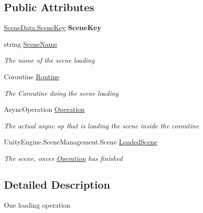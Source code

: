 \subsection*{Public Attributes}
\begin{DoxyCompactItemize}
\item 
\hypertarget{struct_skyrates_1_1_scene_1_1_scene_loader_1_1_loading_sequence_ae6b9317a5f361eb924a0113975b35710}{\hyperlink{class_skyrates_1_1_scene_1_1_scene_data_a466c9423ed3d053f5513e19abcf76b75}{Scene\-Data.\-Scene\-Key} {\bfseries Scene\-Key}}\label{struct_skyrates_1_1_scene_1_1_scene_loader_1_1_loading_sequence_ae6b9317a5f361eb924a0113975b35710}

\item 
string \hyperlink{struct_skyrates_1_1_scene_1_1_scene_loader_1_1_loading_sequence_a2284fa04ca8aa448df6b95555a902b8d}{Scene\-Name}
\begin{DoxyCompactList}\small\item\em The name of the scene loading \end{DoxyCompactList}\item 
Coroutine \hyperlink{struct_skyrates_1_1_scene_1_1_scene_loader_1_1_loading_sequence_a0dcf79a6448de5293ebe30c457bdfb08}{Routine}
\begin{DoxyCompactList}\small\item\em The Coroutine doing the scene loading \end{DoxyCompactList}\item 
Async\-Operation \hyperlink{struct_skyrates_1_1_scene_1_1_scene_loader_1_1_loading_sequence_a1b6c883f0abf5657766a31dd020faa1a}{Operation}
\begin{DoxyCompactList}\small\item\em The actual async op that is loading the scene inside the coroutine \end{DoxyCompactList}\item 
Unity\-Engine.\-Scene\-Management.\-Scene \hyperlink{struct_skyrates_1_1_scene_1_1_scene_loader_1_1_loading_sequence_a04048908c4fe7f27b2f1066abcd38e9b}{Loaded\-Scene}
\begin{DoxyCompactList}\small\item\em The scene, onces \hyperlink{struct_skyrates_1_1_scene_1_1_scene_loader_1_1_loading_sequence_a1b6c883f0abf5657766a31dd020faa1a}{Operation} has finished \end{DoxyCompactList}\end{DoxyCompactItemize}


\subsection{Detailed Description}
One loading operation 



